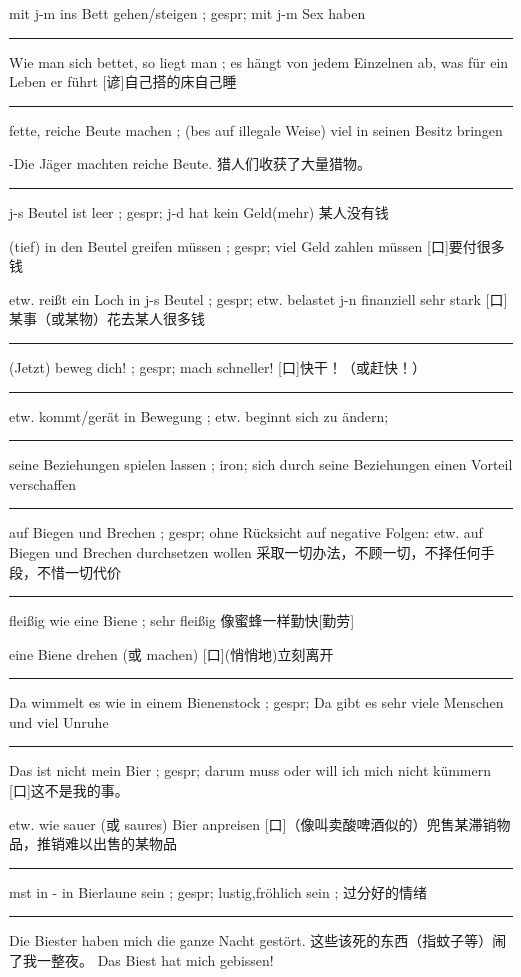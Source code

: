 mit j-m ins Bett gehen/steigen ; gespr; mit j-m Sex haben

\noindent\rule{\textwidth}{1pt} 
Wie man sich bettet, so liegt man ; es hängt von jedem Einzelnen ab, was für ein Leben er führt
[谚]自己搭的床自己睡

\noindent\rule{\textwidth}{1pt} 
fette, reiche Beute machen ; (bes auf illegale Weise) viel in seinen Besitz bringen

-Die Jäger machten reiche Beute. 猎人们收获了大量猎物。

\noindent\rule{\textwidth}{1pt} 
j-s Beutel ist leer ; gespr; j-d hat kein Geld(mehr)
某人没有钱

(tief) in den Beutel greifen müssen ; gespr; viel Geld zahlen müssen
[口]要付很多钱

etw. reißt ein Loch in j-s Beutel ; gespr; etw. belastet j-n finanziell sehr stark
[口]某事（或某物）花去某人很多钱

\noindent\rule{\textwidth}{1pt} 
(Jetzt) beweg dich! ; gespr; mach schneller!
[口]快干！（或赶快！）

\noindent\rule{\textwidth}{1pt} 
etw. kommt/gerät in Bewegung ; etw. beginnt sich zu ändern;

\noindent\rule{\textwidth}{1pt} 
seine Beziehungen spielen lassen ; iron; sich durch seine Beziehungen einen Vorteil verschaffen

\noindent\rule{\textwidth}{1pt} 
auf Biegen und Brechen ; gespr; ohne Rücksicht auf negative Folgen: etw. auf Biegen und Brechen durchsetzen wollen
采取一切办法，不顾一切，不择任何手段，不惜一切代价

\noindent\rule{\textwidth}{1pt} 
fleißig wie eine Biene ; sehr fleißig
像蜜蜂一样勤快[勤劳]

eine Biene drehen (或 machen) [口](悄悄地)立刻离开

\noindent\rule{\textwidth}{1pt} 
Da wimmelt es wie in einem Bienenstock ; gespr; Da gibt es sehr viele Menschen und viel Unruhe

\noindent\rule{\textwidth}{1pt} 
Das ist nicht mein Bier ; gespr; darum muss oder will ich mich nicht kümmern
[口]这不是我的事。

etw. wie sauer (或 saures) Bier anpreisen [口]（像叫卖酸啤酒似的）兜售某滞销物品，推销难以出售的某物品

\noindent\rule{\textwidth}{1pt} 
mst in - in Bierlaune sein ; gespr; lustig,fröhlich sein ; 过分好的情绪

\noindent\rule{\textwidth}{1pt} 
Die Biester haben mich die ganze Nacht gestört. 这些该死的东西（指蚊子等）闹了我一整夜。
Das Biest hat mich gebissen!

